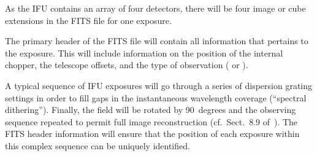 As the IFU contains an array of four detectors, there will be four
image or cube extensions in the FITS file for one exposure.

The primary header of the FITS file will contain all information that
pertains to the exposure. This will include information on the
position of the internal chopper, the telescope offsets, and the type
of observation ( or ).

A typical sequence of IFU exposures will go through a series of
dispersion grating settings in order to fill gaps in the instantaneous
wavelength coverage (``spectral dithering''). Finally, the field will be
rotated by 90~degrees and the observing sequence repeated to permit
full image reconstruction
(cf.~Sect.~8.9 of~\cite{DRLS}). The FITS header
information will ensure that the position of each exposure within this
complex sequence can be uniquely identified.




